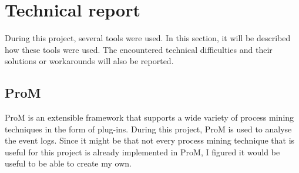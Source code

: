 

\section{Technical report}
During this project, several tools were used. In this section, it will be described how these tools were used. The encountered technical difficulties and their solutions or workarounds will also be reported.

\subsection{ProM}
ProM is an extensible framework that supports a wide variety of process mining techniques in the form of plug-ins\cite{promTools}. 
During this project, ProM is used to analyse the event logs. Since it might be that not every process mining technique that is useful for this project is already implemented in ProM, I figured it would be useful to be able to create my own.

